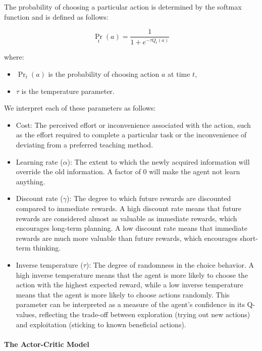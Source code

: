 \documentclass[
  number,
  preprint,
  3p,
  onecolumn]{elsarticle}
\let\oldparagraph\paragraph
\renewcommand{\paragraph}[1]{\oldparagraph{#1}\mbox{}}
\providecommand{\tightlist}{%
  \setlength{\itemsep}{0pt}\setlength{\parskip}{0pt}}\usepackage{longtable,booktabs,array}
\begin{document}
The probability of choosing a particular action is determined by the
softmax function and is defined as follows:

\[
\Pr_t(a) = \frac{1}{1+e^{-\tau Q_{t}(a)}}
\]

where:

\begin{itemize}
\tightlist
\item
  \(\Pr_{t}(a)\) is the probability of choosing action \(a\) at time
  \(t\),
\item
  \(\tau\) is the temperature parameter.
\end{itemize}

We interpret each of these parameters as follows:

\begin{itemize}
\item
  Cost: The perceived effort or inconvenience associated with the
  action, such as the effort required to complete a particular task or
  the inconvenience of deviating from a preferred teaching method.
\item
  Learning rate (\(\alpha\)): The extent to which the newly acquired
  information will override the old information. A factor of 0 will make
  the agent not learn anything.
\item
  Discount rate (\(\gamma\)): The degree to which future rewards are
  discounted compared to immediate rewards. A high discount rate means
  that future rewards are considered almost as valuable as immediate
  rewards, which encourages long-term planning. A low discount rate
  means that immediate rewards are much more valuable than future
  rewards, which encourages short-term thinking.
\item
  Inverse temperature (\(\tau\)): The degree of randomness in the choice
  behavior. A high inverse temperature means that the agent is more
  likely to choose the action with the highest expected reward, while a
  low inverse temperature means that the agent is more likely to choose
  actions randomly. This parameter can be interpreted as a measure of
  the agent's confidence in its Q-values, reflecting the trade-off
  between exploration (trying out new actions) and exploitation
  (sticking to known beneficial actions).
\end{itemize}

\paragraph{The Actor-Critic Model}\label{the-actor-critic-model-1}
\end{document}
